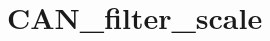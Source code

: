 \hypertarget{group___c_a_n__filter__scale}{\section{C\-A\-N\-\_\-filter\-\_\-scale}
\label{group___c_a_n__filter__scale}
}
